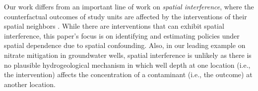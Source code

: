 \documentclass[12pt]{article}
\newcommand{\CP}[1]{{\color{purple}From Chan: #1}}
\newcommand{\XL}[1]{{\color{blue}from Xindi: #1}}
\begin{document}
Our work differs from an important line of work on \emph{spatial interference}, where the counterfactual outcomes of study units are affected by the interventions of their spatial neighbors \citep{verbitsky2012causal,papadogeorgou2019causal,papadogeorgou2023spatial,interfereluo2024policy,zigler2021bipartite, giffin2023generalized}. 
While there are interventions  that can exhibit spatial interference, this paper's focus is on identifying and estimating policies under spatial dependence due to spatial confounding. 
Also, in our leading example on  nitrate mitigation in groundwater wells, spatial interference is unlikely as there is no plausible hydrogeological mechanism in which well depth at one location (i.e., the intervention) affects the concentration of a contaminant (i.e., the outcome) at another location. 

\end{document}
